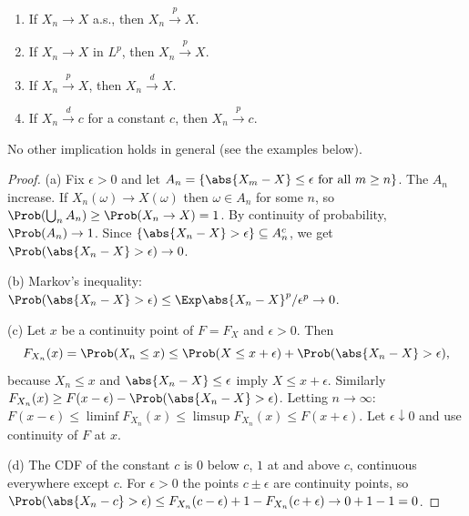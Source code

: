 \begin{theorem}\label{thm:modes}
\begin{enumerate}[label=(\alph*)]
\item If $X_n\to X$ a.s., then $X_n\xrightarrow{p}X$.
\item If $X_n\to X$ in $L^p$, then $X_n\xrightarrow{p}X$.
\item If $X_n\xrightarrow{p}X$, then $X_n\xrightarrow{d}X$.
\item If $X_n\xrightarrow{d}c$ for a constant $c$, then $X_n\xrightarrow{p}c$.
\end{enumerate}
No other implication holds in general (see the examples below).
\end{theorem}
\begin{proof}
(a) Fix $\epsilon>0$ and let $A_n=\{\abs{X_m-X}\le\epsilon\text{ for all }m\ge n\}$. The
$A_n$ increase. If $X_n(\omega)\to X(\omega)$ then $\omega\in A_n$ for some $n$,
so $\Prob(\bigcup_nA_n)\ge\Prob(X_n\to X)=1$. By continuity of probability,
$\Prob(A_n)\to1$. Since $\{\abs{X_n-X}>\epsilon\}\subseteq A_n^c$, we get
$\Prob(\abs{X_n-X}>\epsilon)\to0$.

(b) Markov's inequality: $\Prob(\abs{X_n-X}>\epsilon)\le\Exp\abs{X_n-X}^p/\epsilon^p\to0$.

(c) Let $x$ be a continuity point of $F=F_X$ and $\epsilon>0$. Then
\[
F_{X_n}(x)=\Prob(X_n\le x)\le\Prob(X\le x+\epsilon)+\Prob(\abs{X_n-X}>\epsilon),
\]
because $X_n\le x$ and $\abs{X_n-X}\le\epsilon$ imply $X\le x+\epsilon$. Similarly
$F_{X_n}(x)\ge F(x-\epsilon)-\Prob(\abs{X_n-X}>\epsilon)$. Letting $n\to\infty$:
$F(x-\epsilon)\le\liminf F_{X_n}(x)\le\limsup F_{X_n}(x)\le F(x+\epsilon)$. Let
$\epsilon\downarrow0$ and use continuity of $F$ at $x$.

(d) The CDF of the constant $c$ is $0$ below $c$, $1$ at and above $c$, continuous
everywhere except $c$. For $\epsilon>0$ the points $c\pm\epsilon$ are continuity
points, so
$\Prob(\abs{X_n-c}>\epsilon)\le F_{X_n}(c-\epsilon)+1-F_{X_n}(c+\epsilon)\to0+1-1=0$.
\end{proof}

